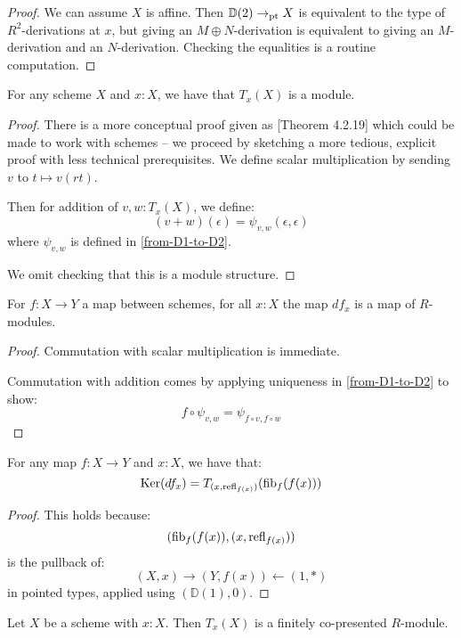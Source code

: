 \begin{proof}
We can assume $X$ is affine. Then $\mathbb{D}(2)\to_{\mathrm{pt}} X$ is equivalent to the type of $R^2$-derivations at $x$, but giving an $M\oplus N$-derivation is equivalent to giving an $M$-derivation and an $N$-derivation. Checking the equalities is a routine computation.
\end{proof}

\begin{lemma}
For any scheme $X$ and $x:X$, we have that $T_x(X)$ is a module.
\end{lemma}

\begin{proof}
There is a more conceptual proof given as \cite{david-orbifolds}[Theorem 4.2.19] which could be made to work with schemes -- we proceed by sketching a more tedious, explicit proof with less technical prerequisites.
We define scalar multiplication by sending $v$ to $t\mapsto v(rt)$.

Then for addition of $v,w:T_x(X)$, we define:
\[(v+w)(\epsilon) = \psi_{v,w}(\epsilon,\epsilon)\]
where $\psi_{v,w}$ is defined in \cref{from-D1-to-D2}.

We omit checking that this is a module structure.
\end{proof}

\begin{lemma}
For $f:X\to Y$ a map between schemes, for all $x:X$ the map $df_x$ is a map of $R$-modules.
\end{lemma}

\begin{proof}
Commutation with scalar multiplication is immediate.

Commutation with addition comes by applying uniqueness in \cref{from-D1-to-D2} to show:
\[f\circ \psi_{v,w} = \psi_{f\circ v,f\circ w}\]
\end{proof}

\begin{lemma}\label{kernel-is-tangent-of-fibers}
For any map $f:X\to Y$ and $x:X$, we have that:
\[
\mathrm{Ker}(df_x) = T_{(x,\mathrm{refl}_{f(x)})}(\mathrm{fib}_f(f(x)))
\]
\end{lemma}

\begin{proof}
This holds because:
\[
(\mathrm{fib}_f(f(x)),(x,\mathrm{refl}_{f(x)}))
\]
is the pullback of:
\[
(X,x) \to (Y,f(x)) \leftarrow (1,*)
\]
in pointed types, applied using $(\mathbb{D}(1),0)$.
\end{proof}

\begin{lemma}\label{tangent-finite-copresented}
Let $X$ be a scheme with $x : X$. Then $T_x(X)$ is a finitely
co-presented $R$-module.
\end{lemma}

